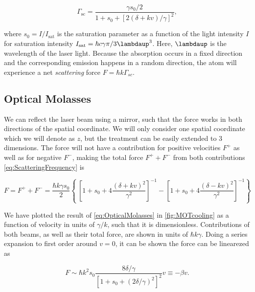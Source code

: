 \begin{equation}\label{eq:ScatteringFrequency}
	\Gamma_{\text{sc}} = \frac{ \gamma s_0 /2}{1+s_0+\left[2(\delta+ k v)/\gamma\right]^2},
\end{equation}

where $s_0 = I/I_{\text{sat}}$ is the saturation parameter as a function of the light intensity $I$ for saturation intensity $I_{\text{sat}} = \hbar c \gamma \pi/3\lambdaup^3$. 
Here, $\lambdaup$ is the wavelength of the laser light.
Because the absorption occurs in a fixed direction and the corresponding emission happens in a random direction, the atom will experience a net \textit{scattering} force $F = \hbar k \Gamma_{sc}$.

\subsection{Optical Molasses}

We can reflect the laser beam using a mirror, such that the force works in both directions of the spatial coordinate.
We will only consider one spatial coordinate which we will denote as $z$, but the treatment can be easily extended to 3 dimensions.
The force will not have a contribution for positive velocities $F^+$ as well as for negative $F^-$, making the total force $F^+ + F^-$ from both contributions \cref{eq:ScatteringFrequency} is \cite{Kowalski2010}

\begin{equation}\label{eq:OpticalMolasses}
	F = F^+ + F^- = \frac{\hbar k \gamma s_0}{2}\left\{\
	\left[1 + s_0 + 4\frac{(\delta+kv)^2}{\gamma^2}\right]^{-1}-
	\left[1 + s_0 + 4\frac{(\delta-kv)^2}{\gamma^2}\right]^{-1}
	\right\}
\end{equation}

We have plotted the result of \cref{eq:OpticalMolasses} in \cref{fig:MOTcooling} as a function of velocity in units of $\gamma / k$, such that it is dimensionless. Contributions of both beams, as well as their total force, are shown in units of $\hbar k \gamma$.
Doing a series expansion to first order around $v = 0$, it can be shown the force can be linearezed as \cite{Metcalf1999}

\begin{equation}\label{eq:ForceLinearized}
	F \sim \hbar k^2 s_0 \frac{8\delta/\gamma}{\left[1+s_0+(2\delta/\gamma)^2\right]^2} v 
	\equiv -\beta v.
\end{equation}

